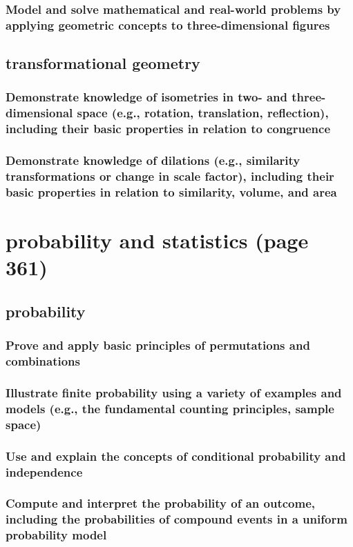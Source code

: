 \documentclass[11pt]{article}
\begin{document}
\subsubsection{Model and solve mathematical and real-world problems by applying geometric concepts to three-dimensional figures}
\label{sec:orgd7c44ce}
\subsection{transformational geometry}
\label{sec:org46d213a}
\subsubsection{Demonstrate knowledge of isometries in two- and three-dimensional space (e.g., rotation, translation, reflection), including their basic properties in relation to congruence}
\label{sec:org9209d87}
\subsubsection{Demonstrate knowledge of dilations (e.g., similarity transformations or change in scale factor), including their basic properties in relation to similarity, volume, and area}
\label{sec:orgb91092f}
\section{probability and statistics (page 361)}
\label{sec:org39e1911}
\subsection{probability}
\label{sec:orgdd1b7be}
\subsubsection{Prove and apply basic principles of permutations and combinations}
\label{sec:orgf33854d}
\subsubsection{Illustrate finite probability using a variety of examples and models (e.g., the fundamental counting principles, sample space)}
\label{sec:org9410fb4}
\subsubsection{Use and explain the concepts of conditional probability and independence}
\label{sec:org4773feb}
\subsubsection{Compute and interpret the probability of an outcome, including the probabilities of compound events in a uniform probability model}
\label{sec:org80bf4ea}
\end{document}
